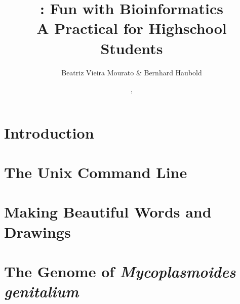 \documentclass[a4paper]{report}
\begin{document}
\pagestyle{noweb}

\title{:  Fun with Bioinformatics\\\small A Practical for
  Highschool Students}
\author{Beatriz Vieira Mourato \& Bernhard Haubold}
\date{\hspace{-3pt}, }
\maketitle

\tableofcontents

\chapter{Introduction}\label{ch:intro}

\chapter{The Unix Command Line}\label{ch:unix}

\chapter{Making Beautiful Words and Drawings}\label{ch:latex}

\chapter{The Genome of \emph{Mycoplasmoides genitalium}}\label{ch:genome}



\end{document}

